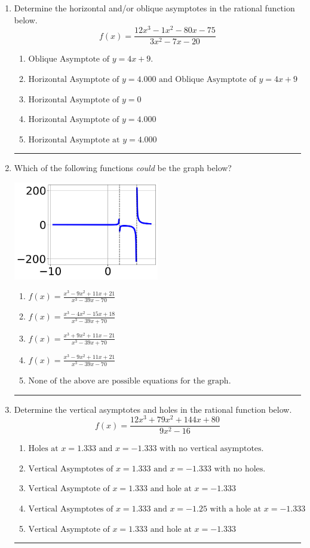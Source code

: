 \documentclass[14pt]{extbook}
\newcommand{\litem}[1]{\item#1\hspace*{-1cm}\rule{\textwidth}{0.4pt}}
\begin{document}
\begin{enumerate}
\litem{
Determine the horizontal and/or oblique asymptotes in the rational function below.\[ f(x) = \frac{12x^{3} -1 x^{2} -80 x -75}{3x^{2} -7 x -20} \]\begin{enumerate}[label=\Alph*.]
\item \( \text{Oblique Asymptote of } y = 4x + 9. \)
\item \( \text{Horizontal Asymptote of } y = 4.000 \text{ and Oblique Asymptote of } y = 4x + 9 \)
\item \( \text{Horizontal Asymptote of } y = 0 \)
\item \( \text{Horizontal Asymptote of } y = 4.000  \)
\item \( \text{Horizontal Asymptote at } y = 4.000 \)

\end{enumerate} }
\litem{
Which of the following functions \textit{could} be the graph below?
\begin{center}
    \includegraphics[width=0.5\textwidth]{../Figures/identifyGraphOfRationalFunctionCopyA.png}
\end{center}
\begin{enumerate}[label=\Alph*.]
\item \( f(x)=\frac{x^{3} -9 x^{2} +11 x + 21}{x^{3} -39 x -70} \)
\item \( f(x)=\frac{x^{3} -4 x^{2} -15 x + 18}{x^{3} -39 x + 70} \)
\item \( f(x)=\frac{x^{3} +9 x^{2} +11 x -21}{x^{3} -39 x + 70} \)
\item \( f(x)=\frac{x^{3} -9 x^{2} +11 x + 21}{x^{3} -39 x -70} \)
\item \( \text{None of the above are possible equations for the graph.} \)

\end{enumerate} }
\litem{
Determine the vertical asymptotes and holes in the rational function below.\[ f(x) = \frac{12x^{3} +79 x^{2} +144 x + 80}{9x^{2} -16} \]\begin{enumerate}[label=\Alph*.]
\item \( \text{Holes at } x = 1.333 \text{ and } x = -1.333 \text{ with no vertical asymptotes.} \)
\item \( \text{Vertical Asymptotes of } x = 1.333 \text{ and } x = -1.333 \text{ with no holes.} \)
\item \( \text{Vertical Asymptote of } x = 1.333 \text{ and hole at } x = -1.333 \)
\item \( \text{Vertical Asymptotes of } x = 1.333 \text{ and } x = -1.25 \text{ with a hole at } x = -1.333 \)
\item \( \text{Vertical Asymptote of } x = 1.333 \text{ and hole at } x = -1.333 \)


\end{enumerate}}
\end{enumerate}
\end{document}
